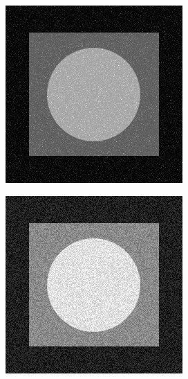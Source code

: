 \begin{figure}[h]
  	\begin{subfigure}[b]{0.25\linewidth}
		\includegraphics[width=\linewidth]{myfigure/p4/41-exp.png}
		\caption{}
		\label{fig:add_exp}
	\end{subfigure}
  	\begin{subfigure}[b]{0.25\linewidth}
		\includegraphics[width=\linewidth]{myfigure/p4/41-uniform.png}

\end{subfigure}
\end{figure}
